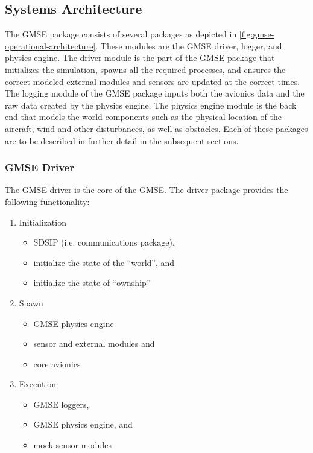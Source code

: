 \subsection{Systems Architecture} \label{sec:gmse-systems-architecture}

The GMSE package consists of several packages as depicted in
\autoref{fig:gmse-operational-architecture}.
These modules are the GMSE driver, logger, and physics engine. The driver module is the part of the
GMSE package that initializes the simulation, spawns all the required processes, and ensures the
correct modeled external modules and sensors are updated at the correct times. The logging module of
the GMSE package inputs both the avionics data and the raw data created by the physics engine. The
physics engine module is the back end that models the world components such as the physical location
of the aircraft, wind and other disturbances, as well as obstacles. Each of these packages are to be
described in further detail in the subsequent sections.

\subsubsection{GMSE Driver}

The GMSE driver is the core of the GMSE. The driver package provides the following functionality:

\begin{enumerate}
  \item Initialization
    \begin{itemize}
      \item SDSIP (i.e. communications package),
      \item initialize the state of the ``world'', and
      \item initialize the state of ``ownship''
    \end{itemize}
  \item Spawn
    \begin{itemize}
      \item GMSE physics engine
      \item sensor and external modules and
      \item core avionics
    \end{itemize}
  \item Execution
    \begin{itemize}
      \item GMSE loggers,
      \item GMSE physics engine, and
      \item mock sensor modules
    \end{itemize}
\end{enumerate}

